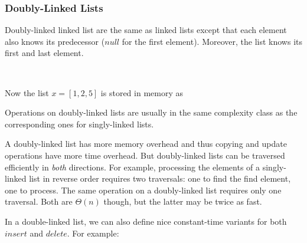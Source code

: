 \subsubsection{Doubly-Linked Lists}

Doubly-linked linked list are the same as linked lists except that each element also knows its predecessor ($null$ for the first element).
Moreover, the list knows its first and last element.

\begin{acode}
\\
\end{acode}

Now the list $x=[1,2,5]$ is stored in memory as
\begin{amemory}
\alocations
{}
\hline
{}
\hline
{}
\hline
{}
\end{amemory}

Operations on doubly-linked lists are usually in the same complexity class as the corresponding ones for singly-linked lists.

A doubly-linked list has more memory overhead and thus copying and update operations have more time overhead.
But doubly-linked lists can be traversed efficiently in \emph{both} directions.
For example, processing the elements of a singly-linked list in reverse order requires two traversals: one to find the find element, one to process.
The same operation on a doubly-linked list requires only one traversal.
Both are $\Theta(n)$ though, but the latter may be twice as fast.

In a double-linked list, we can also define nice constant-time variants for both $insert$ and $delete$.
For example:
\begin{acode}
\end{acode}

